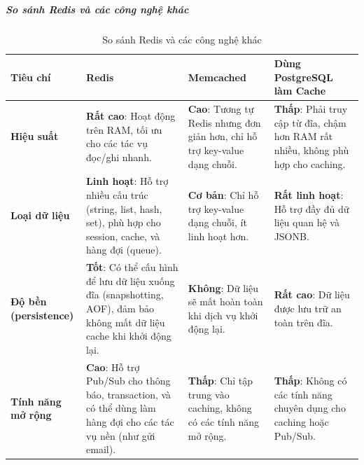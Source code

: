 \subparagraph{So sánh Redis và các công nghệ khác}
\clearpage
\begin{landscape}
\begin{table}[h!]
\centering
\setlength{\tabcolsep}{4pt}
\footnotesize
\begin{tabularx}{\linewidth}{|l|X|X|X|}
\hline
\textbf{Tiêu chí} & \textbf{Redis} & \textbf{Memcached} & \textbf{Dùng PostgreSQL làm Cache} \\
\hline
\textbf{Hiệu suất} & \textbf{Rất cao}: Hoạt động trên RAM, tối ưu cho các tác vụ đọc/ghi nhanh. & \textbf{Cao}: Tương tự Redis nhưng đơn giản hơn, chỉ hỗ trợ key-value dạng chuỗi. & \textbf{Thấp}: Phải truy cập từ đĩa, chậm hơn RAM rất nhiều, không phù hợp cho caching. \\
\hline
\textbf{Loại dữ liệu} & \textbf{Linh hoạt}: Hỗ trợ nhiều cấu trúc (string, list, hash, set), phù hợp cho session, cache, và hàng đợi (queue). & \textbf{Cơ bản}: Chỉ hỗ trợ key-value dạng chuỗi, ít linh hoạt hơn. & \textbf{Rất linh hoạt}: Hỗ trợ đầy đủ dữ liệu quan hệ và JSONB. \\
\hline
\textbf{Độ bền (persistence)} & \textbf{Tốt}: Có thể cấu hình để lưu dữ liệu xuống đĩa (snapshotting, AOF), đảm bảo không mất dữ liệu cache khi khởi động lại. & \textbf{Không}: Dữ liệu sẽ mất hoàn toàn khi dịch vụ khởi động lại. & \textbf{Rất cao}: Dữ liệu được lưu trữ an toàn trên đĩa. \\
\hline
\textbf{Tính năng mở rộng} & \textbf{Cao}: Hỗ trợ Pub/Sub cho thông báo, transaction, và có thể dùng làm hàng đợi cho các tác vụ nền (như gửi email). & \textbf{Thấp}: Chỉ tập trung vào caching, không có các tính năng mở rộng. & \textbf{Thấp}: Không có các tính năng chuyên dụng cho caching hoặc Pub/Sub. \\
\hline
\end{tabularx}
\caption{So sánh Redis và các công nghệ khác}
\end{table}
\end{landscape}
